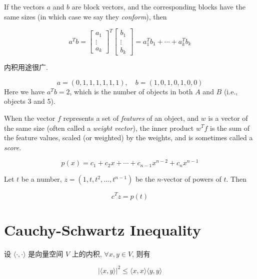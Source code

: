 \begin{definition}
    If the vectors $ a $ and $ b $ are block vectors, and the corresponding blocks have the same sizes (in which case we say they \textit{conform}), then 

    $$ a^{T} b=\left[\begin{array}{c}a_{1} \\ \vdots \\ a_{k}\end{array}\right]^{T}\left[\begin{array}{c}b_{1} \\ \vdots \\ b_{k}\end{array}\right]=a_{1}^{T} b_{1}+\cdots+a_{k}^{T} b_{k} $$
\end{definition}

内积用途很广.

\begin{example}[计算同时出现的项目数]
   $$
a=(0,1,1,1,1,1,1), \quad b=(1,0,1,0,1,0,0)
$$
Here we have $ a^{T} b=2 $, which is the number of objects in both $ A $ and $ B $ (i.e., objects 3 and 5). 
\end{example}

\begin{example}
    When the vector $f$ represents a set of \textit{features} of
    an object, and $w$ is a vector of the same size (often called a \textit{weight vector}), the
    inner product $w^T f$ is the sum of the feature values, scaled (or weighted) by
    the weights, and is sometimes called a \textit{score}.
\end{example}

\begin{example}
    $$ p(x)=c_{1}+c_{2} x+\cdots+c_{n-1} x^{n-2}+c_{n} x^{n-1} $$

    Let $t$ be a number, $ z=\left(1, t, t^{2}, \ldots, t^{n-1}\right) $  be the $n$-vector of powers
    of $t$. Then

    $$ c^{T} z=p(t) $$
\end{example}


\section{Cauchy-Schwartz Inequality}
\begin{theorem}
    设 \( \langle \cdot,\cdot \rangle \) 是向量空间 \( V \) 上的内积, \( \forall x, y \in V \), 则有

    $$
|\langle x, y\rangle|^{2} \leq\langle x, x\rangle\langle y, y\rangle
$$
\end{theorem}

